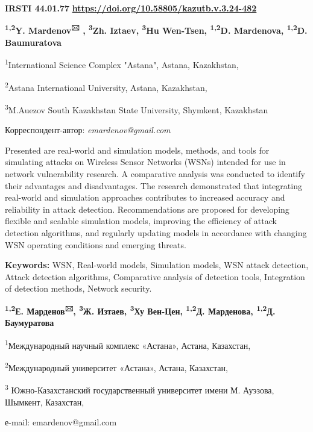 \newpage
{\bfseries IRSTI 44.01.77}
\hfill {\bfseries \href{https://doi.org/10.58805/kazutb.v.3.24-482}{https://doi.org/10.58805/kazutb.v.3.24-482}}


\begin{center}

{\bfseries \textsuperscript{1,2}Y. Mardenov\textsuperscript{🖂} ,
\textsuperscript{3}Zh. Iztaev, \textsuperscript{3}Hu Wen-Tsen,
\textsuperscript{1,2}D. Mardenova, \textsuperscript{1,2}D. Baumuratova}

\textsuperscript{1}International Science Complex "Astana", Astana,
Kazakhstan,

\textsuperscript{2}Astana International University, Astana, Kazakhstan,

\textsuperscript{3}M.Auezov South Kazakhstan State University, Shymkent,
Kazakhstan
\end{center}
Корреспондент-автор: \emph{emardenov@gmail.com}\vspace{0.5cm}

Presented are real-world and simulation models, methods, and tools for
simulating attacks on Wireless Sensor Networks (WSNs) intended for use
in network vulnerability research. A comparative analysis was conducted
to identify their advantages and disadvantages. The research
demonstrated that integrating real-world and simulation approaches
contributes to increased accuracy and reliability in attack detection.
Recommendations are proposed for developing flexible and scalable
simulation models, improving the efficiency of attack detection
algorithms, and regularly updating models in accordance with changing
WSN operating conditions and emerging threats.

{\bfseries Keywords:} WSN, Real-world models, Simulation models, WSN
attack detection, Attack detection algorithms, Comparative analysis of
detection tools, Integration of detection methods, Network security.



\begin{center}
{\bfseries \textsuperscript{1,2}Е. Марденов\textsuperscript{🖂},
\textsuperscript{3}Ж. Изтаев, \textsuperscript{3}Ху Вен-Цен,
\textsuperscript{1,2}Д. Марденова, \textsuperscript{1,2}Д. Баумуратова}

\textsuperscript{1}Международный научный комплекс «Астана», Астана,
Казахстан,

\textsuperscript{2}Международный университет «Астана», Астана,
Казахстан,

\textsuperscript{3} Южно-Казахстанский государственный университет имени
М. Ауэзова, Шымкент, Казахстан,

е-mail: emardenov@gmail.com
\end{center}

